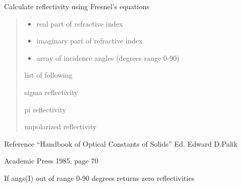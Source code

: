 \documentclass[letterpaper,10pt,english]{sphinxmanual}
\begin{document}
\begin{fulllineitems}
\label{\detokenize{xsrt_functions:xsrt.fresnel}}
Calculate reflectivity using Fresnel’s equations
\begin{quote}\begin{description}
\item[{Parameters}] \leavevmode\begin{itemize}
\item {} 
 \textendash{} real part of refractive index

\item {} 
 \textendash{} imaginary part of refractive index

\item {} 
 \textendash{} array of incidence angles (degrees range 0-90)

\end{itemize}

\item[{Returns}] \leavevmode

\begin{DUlineblock}{0em}
\item[] list of following
\item[]
\begin{DUlineblock}{\DUlineblockindent}
\item[]           sigma reflectivity
\item[]           pi reflectivity
\item[]         unpolarized reflectivity
\end{DUlineblock}
\end{DUlineblock}


\end{description}\end{quote}

\begin{DUlineblock}{0em}
\item[] Reference “Handbook of Optical Constants of Solids” Ed. Edward D.Palik
\item[] Academic Press 1985, page 70
\item[] If angs(I) out of range 0-90 degrees returns zero reflectivities
\end{DUlineblock}

\end{fulllineitems}
\end{document}
